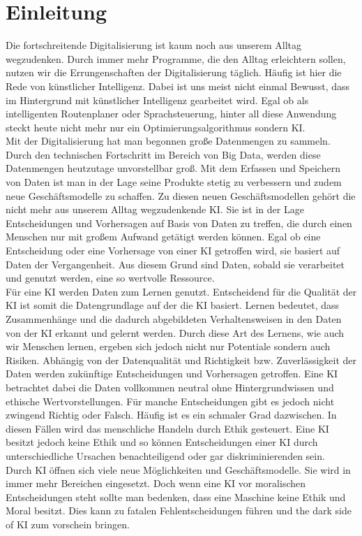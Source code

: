 \chapter{Einleitung}
    \begin{onehalfspace}    
        \label{sec:einleitung}
            Die fortschreitende Digitalisierung ist kaum noch aus unserem Alltag wegzudenken. Durch immer mehr Programme, die den Alltag erleichtern sollen, nutzen wir die Errungenschaften der Digitalisierung täglich. Häufig ist hier die Rede von künstlicher Intelligenz. Dabei ist uns meist nicht einmal Bewusst, dass im Hintergrund mit künstlicher Intelligenz gearbeitet wird. Egal ob als intelligenten Routenplaner oder Sprachsteuerung, hinter all diese Anwendung steckt heute nicht mehr nur ein Optimierungsalgorithmus sondern \ac{KI}. 
            \\
            Mit der Digitalisierung hat man begonnen große Datenmengen zu sammeln. Durch den technischen Fortschritt im Bereich von Big Data, werden diese Datenmengen heutzutage unvorstellbar groß. Mit dem Erfassen und Speichern von Daten ist man in der Lage seine Produkte stetig zu verbessern und zudem neue Geschäftsmodelle zu schaffen. Zu diesen neuen Geschäftsmodellen gehört die nicht mehr aus unserem Alltag wegzudenkende \ac{KI}. Sie ist in der Lage Entscheidungen und Vorhersagen auf Basis von Daten zu treffen, die durch einen Menschen nur  mit großem Aufwand getätigt werden können.  Egal ob eine Entscheidung oder eine Vorhersage von einer \ac{KI} getroffen wird, sie basiert auf Daten der Vergangenheit. Aus diesem Grund sind Daten, sobald sie verarbeitet und genutzt werden, eine so wertvolle Ressource.
            \\
            Für eine \ac*{KI} werden Daten zum Lernen genutzt. Entscheidend für die Qualität der \ac*{KI} ist somit die Datengrundlage auf der die \ac*{KI} basiert. Lernen bedeutet, dass Zusammenhänge und die dadurch abgebildeten Verhaltensweisen in den Daten von der \ac*{KI} erkannt und gelernt werden. Durch diese Art des Lernens, wie auch wir Menschen lernen, ergeben sich jedoch nicht nur Potentiale sondern auch Risiken. Abhängig von der Datenqualität und Richtigkeit bzw. Zuverlässigkeit der Daten werden zukünftige Entscheidungen und Vorhersagen getroffen. Eine \ac*{KI} betrachtet dabei die Daten vollkommen neutral ohne Hintergrundwissen und ethische Wertvorstellungen. Für manche Entscheidungen gibt es jedoch nicht zwingend Richtig oder Falsch. Häufig ist es ein schmaler Grad dazwischen. In diesen Fällen wird das menschliche Handeln durch Ethik gesteuert. Eine \ac*{KI} besitzt jedoch keine Ethik und so können Entscheidungen einer KI durch unterschiedliche Ursachen benachteiligend oder gar diskriminierenden sein.
            \\
            Durch \ac*{KI} öffnen sich viele neue Möglichkeiten und Geschäftsmodelle. Sie wird in immer mehr Bereichen eingesetzt. Doch wenn eine \ac*{KI} vor moralischen Entscheidungen steht sollte man bedenken, dass eine Maschine keine Ethik und Moral besitzt. Dies kann zu fatalen Fehlentscheidungen führen und \glqq{}the dark side of \ac*{KI}\grqq{} zum vorschein bringen.


\end{onehalfspace}
